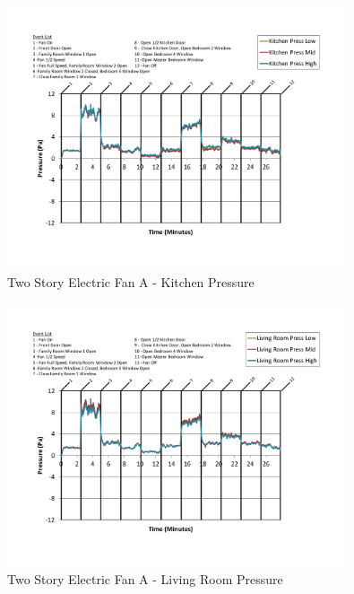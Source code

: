 \documentclass{article}
\begin{document}
\begin{appendices}
	\begin{figure}[H]
		\centering
		\includegraphics[height=3.05in,trim=0.67in 1.1in 0.67in 0.8in,clip=true]{0_Images/Results_Charts/ColdFlow/Two_Story/Electric/A/Kitchen_Pressure.pdf}
		\caption{Two Story Electric Fan A - Kitchen Pressure}
	\end{figure}
 

	\begin{figure}[H]
		\centering
		\includegraphics[height=3.05in,trim=0.67in 1.1in 0.67in 0.8in,clip=true]{0_Images/Results_Charts/ColdFlow/Two_Story/Electric/A/Living_Room_Pressure.pdf}
		\caption{Two Story Electric Fan A - Living Room Pressure}
	\end{figure}
 
	\clearpage


\end{appendices}
\end{document}
